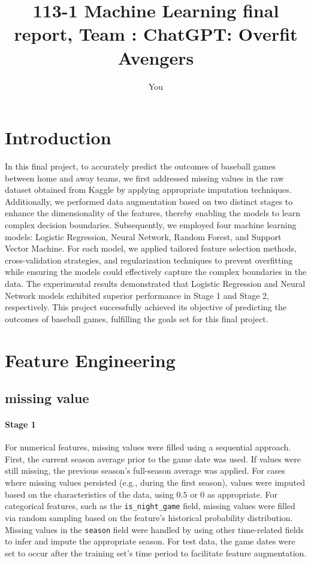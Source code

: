 \documentclass[12pt,a4paper]{article}
\title{\normalsize 113-1 Machine Learning final report, Team : ChatGPT: Overfit Avengers}
\author{\small You}
\begin{document}
\maketitle

\section{Introduction}

In this final project, to accurately predict the outcomes of baseball games between home and away teams, we first addressed missing values in the raw dataset obtained from Kaggle by applying appropriate imputation techniques. Additionally, we performed data augmentation based on two distinct stages to enhance the dimensionality of the features, thereby enabling the models to learn complex decision boundaries.
Subsequently, we employed four machine learning models: Logistic Regression, Neural Network, Random Forest, and Support Vector Machine. For each model, we applied tailored feature selection methods, cross-validation strategies, and regularization techniques to prevent overfitting while ensuring the models could effectively capture the complex boundaries in the data.
The experimental results demonstrated that Logistic Regression and Neural Network models exhibited superior performance in Stage 1 and Stage 2, respectively. This project successfully achieved its objective of predicting the outcomes of baseball games, fulfilling the goals set for this final project.

\section{Feature Engineering}

\subsection{missing value}
\paragraph{\textbf{Stage 1}}
For numerical features, missing values were filled using a sequential approach. First, the current season average prior to the game date was used. If values were still missing, the previous season's full-season average was applied. For cases where missing values persisted (e.g., during the first season), values were imputed based on the characteristics of the data, using $0.5$ or $0$ as appropriate. For categorical features, such as the \texttt{is\_night\_game} field, missing values were filled via random sampling based on the feature's historical probability distribution. Missing values in the \texttt{season} field were handled by using other time-related fields to infer and impute the appropriate season. For test data, the game dates were set to occur after the training set's time period to facilitate feature augmentation.
\end{document}

